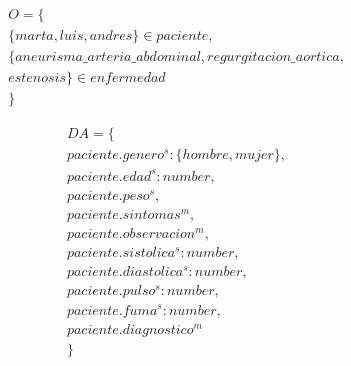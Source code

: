 \documentclass[10pt, a4paper,spanish]{article}
\begin{document}
			\begin{multline*}
				O = \{ \\
					\{marta, luis, andres\} \in paciente, \\
					\{aneurisma\_arteria\_abdominal, regurgitacion\_aortica, \\
					estenosis\} \in enfermedad \\
				\}
			\end{multline*}

			\begin{multline*}
				DA = \{ \\
					paciente.genero^s:\{hombre, mujer\}, \\
					paciente.edad^s:number, \\
					paciente.peso^s, \\
					paciente.sintomas^m, \\
					paciente.observacion^m, \\
					paciente.sistolica^s:number, \\
					paciente.diastolica^s:number, \\
					paciente.pulso^s:number, \\
					paciente.fuma^s:number, \\
 					paciente.diagnostico^m \\
				\}
			\end{multline*}
\end{document}
